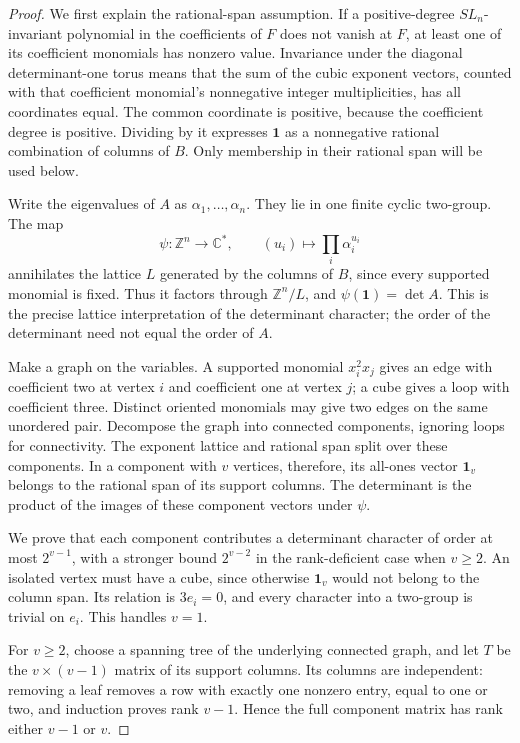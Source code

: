 \begin{proof}
We first explain the rational-span assumption. If a
positive-degree $SL_n$-invariant polynomial in the
coefficients of $F$ does not vanish at $F$, at least one of
its coefficient monomials has nonzero value. Invariance
under the diagonal determinant-one torus means that the
sum of the cubic exponent vectors, counted with that
coefficient monomial's nonnegative integer multiplicities,
has all coordinates equal. The common coordinate is
positive, because the coefficient degree is positive.
Dividing by it expresses $\mathbf1$ as a nonnegative
rational combination of columns of $B$. Only membership
in their rational span will be used below.

Write the eigenvalues of $A$ as $\alpha_1,\ldots,\alpha_n$.
They lie in one finite cyclic two-group. The map
\[
 \psi:\mathbb Z^n\longrightarrow\mathbb C^*,\qquad
 (u_i)\longmapsto\prod_i\alpha_i^{u_i}
 \tag{P-F27b}
\]
annihilates the lattice $L$ generated by the columns of $B$,
since every supported monomial is fixed. Thus it factors
through $\mathbb Z^n/L$, and
$\psi(\mathbf1)=\det A$. This is the precise lattice
interpretation of the determinant character; the order
of the determinant need not equal the order of $A$.

Make a graph on the variables. A supported monomial
$x_i^2x_j$ gives an edge with coefficient two at vertex
$i$ and coefficient one at vertex $j$; a cube gives a loop
with coefficient three. Distinct oriented monomials may
give two edges on the same unordered pair. Decompose the
graph into connected components, ignoring loops for
connectivity. The exponent lattice and rational span
split over these components. In a component with $v$
vertices, therefore, its all-ones vector $\mathbf1_v$
belongs to the rational span of its support columns.
The determinant is the product of the images of these
component vectors under $\psi$.

We prove that each component contributes a determinant
character of order at most $2^{v-1}$, with a stronger
bound $2^{v-2}$ in the rank-deficient case when $v\ge2$.
An isolated vertex must have a cube, since otherwise
$\mathbf1_v$ would not belong to the column span. Its
relation is $3e_i=0$, and every character into a two-group
is trivial on $e_i$. This handles $v=1$.

For $v\ge2$, choose a spanning tree of the underlying
connected graph, and let $T$ be the $v\times(v-1)$ matrix
of its support columns. Its columns are independent:
removing a leaf removes a row with exactly one nonzero
entry, equal to one or two, and induction proves rank
$v-1$. Hence the full component matrix has rank either
$v-1$ or $v$.


\end{proof}
